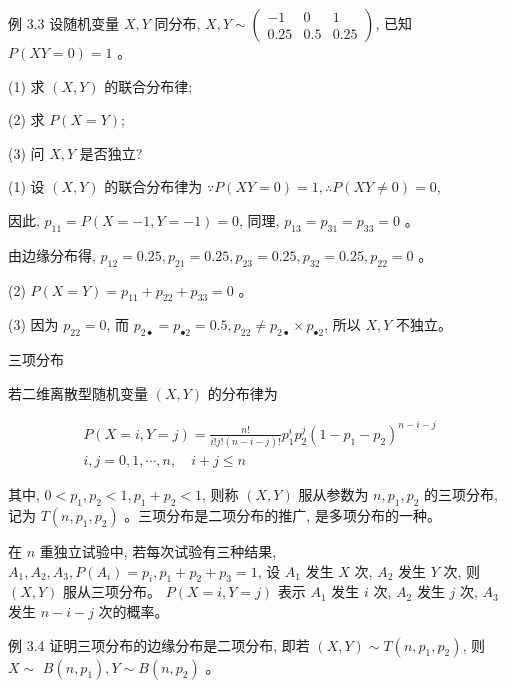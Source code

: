 \documentclass{beamer}
\begin{document}
	\begin{frame}
		例 3.3 设随机变量 $X, Y$ 同分布, $X, Y \sim\left(\begin{array}{ccc}-1 & 0 & 1 \\ 0.25 & 0.5 & 0.25\end{array}\right)$, 已知 $P(X Y=0)=1$ 。
		
		(1) 求 $(X, Y)$ 的联合分布律;
		
		(2) 求 $P(X=Y)$;
		
		(3) 问 $X, Y$ 是否独立?
	\end{frame}
	
	\begin{frame}
		 (1) 设 $(X, Y)$ 的联合分布律为 $\because P(X Y=0)=1, \therefore P(X Y \neq 0)=0$,
		
		因此, $p_{11}=P(X=-1, Y=-1)=0$, 同理, $p_{13}=p_{31}=p_{33}=0$ 。
		
		由边缘分布得, $p_{12}=0.25, p_{21}=0.25, p_{23}=0.25, p_{32}=0.25, p_{22}=0$ 。
		
		(2) $P(X=Y)=p_{11}+p_{22}+p_{33}=0$ 。
		
		(3) 因为 $p_{22}=0$, 而 $p_{2 \bullet}=p_{\bullet 2}=0.5, p_{22} \neq p_{2 \bullet} \times p_{\bullet 2}$, 所以 $X, Y$ 不独立。
	\end{frame}
	
	\begin{frame}
		三项分布
		
		若二维离散型随机变量 $(X, Y)$ 的分布律为
		
		$$
		\begin{gathered}
			P(X=i, Y=j)=\frac{n !}{i ! j !(n-i-j) !} p_{1}^{i} p_{2}^{j}\left(1-p_{1}-p_{2}\right)^{n-i-j} \\
			i, j=0,1, \cdots, n, \quad i+j \leqslant n
		\end{gathered}
		$$
		
		其中, $0<p_{1}, p_{2}<1, p_{1}+p_{2}<1$, 则称 $(X, Y)$ 服从参数为 $n, p_{1}, p_{2}$ 的三项分布, 记为 $T\left(n, p_{1}, p_{2}\right)$ 。三项分布是二项分布的推广, 是多项分布的一种。
		
		在 $n$ 重独立试验中, 若每次试验有三种结果, $A_{1}, A_{2}, A_{3}, P\left(A_{i}\right)=p_{i}, p_{1}+p_{2}+p_{3}=1$, 设 $A_{1}$ 发生 $X$ 次, $A_{2}$ 发生 $Y$ 次, 则 $(X, Y)$ 服从三项分布。 $P(X=i, Y=j)$ 表示 $A_{1}$ 发生 $i$ 次, $A_{2}$ 发生 $j$ 次, $A_{3}$ 发生 $n-i-j$ 次的概率。
	\end{frame}
	
	\begin{frame}
		例 3.4 证明三项分布的边缘分布是二项分布, 即若 $(X, Y) \sim T\left(n, p_{1}, p_{2}\right)$, 则 $X \sim$ $B\left(n, p_{1}\right), Y \sim B\left(n, p_{2}\right)$ 。
	\end{frame}
	
\end{document}
